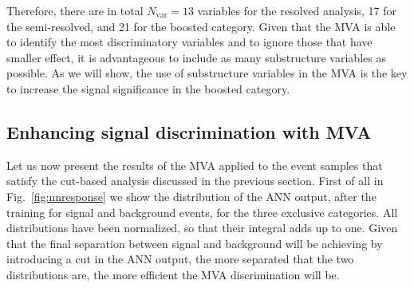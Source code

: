 %
Therefore, there are in total $N_{\mathrm{var}}=13$ variables for the resolved analysis,
17 for the semi-resolved, and 21 for the boosted category.
%
Given that the MVA is able to identify the most discriminatory variables
and to ignore those that have smaller effect, it is advantageous to
include as many substructure variables as possible.
%
As we will show, the use of substructure variables in the MVA is the key to increase the signal
significance in the boosted category.

\subsection{Enhancing signal discrimination with MVA}

Let us now present the results of the MVA applied to the event samples
that satisfy the cut-based analysis discussed in the previous section.
%
First of all in Fig.~\ref{fig:nnresponse} we show the distribution of
the ANN output, after the training for signal and background events, for the three
exclusive categories.
%
All distributions have been normalized, so that their integral
  adds up to one.
%
Given that the final separation between signal and background will be achieving by introducing
a cut in the ANN output, the more separated that the two distributions are, the more efficient
the MVA discrimination will be.



